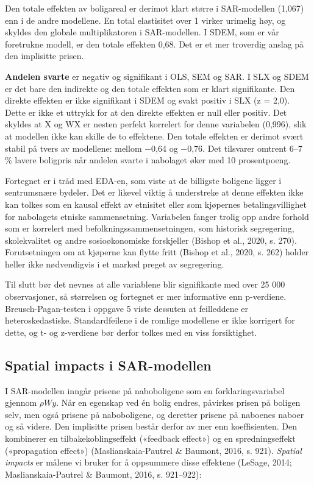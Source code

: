 \documentclass[
  norsk,
  a4paper,
]{article}
\begin{document}
Den totale effekten av boligareal er derimot klart større i SAR-modellen
(1,067) enn i de andre modellene. En total elastisitet over 1 virker
urimelig høy, og skyldes den globale multiplikatoren i SAR-modellen. I
SDEM, som er vår foretrukne modell, er den totale effekten 0,68. Det er
et mer troverdig anslag på den implisitte prisen.

\textbf{Andelen svarte} er negativ og signifikant i OLS, SEM og SAR. I
SLX og SDEM er det bare den indirekte og den totale effekten som er
klart signifikante. Den direkte effekten er ikke signifikant i SDEM og
svakt positiv i SLX (z = 2,0). Dette er ikke et uttrykk for at den
direkte effekten er null eller positiv. Det skyldes at X og WX er nesten
perfekt korrelert for denne variabelen (0,996), slik at modellen ikke
kan skille de to effektene. Den totale effekten er derimot svært stabil
på tvers av modellene: mellom −0,64 og −0,76. Det tilsvarer omtrent 6--7
\% lavere boligpris når andelen svarte i nabolaget øker med 10
prosentpoeng.

Fortegnet er i tråd med EDA-en, som viste at de billigste boligene
ligger i sentrumsnære bydeler. Det er likevel viktig å understreke at
denne effekten ikke kan tolkes som en kausal effekt av etnisitet eller
som kjøpernes betalingsvillighet for nabolagets etniske sammensetning.
Variabelen fanger trolig opp andre forhold som er korrelert med
befolkningssammensetningen, som historisk segregering, skolekvalitet og
andre sosioøkonomiske forskjeller (Bishop et al., 2020, s. 270).
Forutsetningen om at kjøperne kan flytte fritt (Bishop et al., 2020, s.
262) holder heller ikke nødvendigvis i et marked preget av segregering.

Til slutt bør det nevnes at alle variablene blir signifikante med over
25 000 observasjoner, så størrelsen og fortegnet er mer informative enn
p-verdiene. Breusch-Pagan-testen i oppgave 5 viste dessuten at
feilleddene er heteroskedastiske. Standardfeilene i de romlige modellene
er ikke korrigert for dette, og t- og z-verdiene bør derfor tolkes med
en viss forsiktighet.

\subsection{Spatial impacts i
SAR-modellen}\label{spatial-impacts-i-sar-modellen}

I SAR-modellen inngår prisene på naboboligene som en forklaringsvariabel
gjennom \(\rho W y\). Når en egenskap ved én bolig endres, påvirkes
prisen på boligen selv, men også prisene på naboboligene, og deretter
prisene på naboenes naboer og så videre. Den implisitte prisen består
derfor av mer enn koeffisienten. Den kombinerer en tilbakekoblingseffekt
(«feedback effect») og en spredningseffekt («propagation effect»)
(Maslianskaia-Pautrel \& Baumont, 2016, s. 921). \emph{Spatial impacts}
er målene vi bruker for å oppsummere disse effektene (LeSage, 2014;
Maslianskaia-Pautrel \& Baumont, 2016, s. 921--922):
\end{document}
